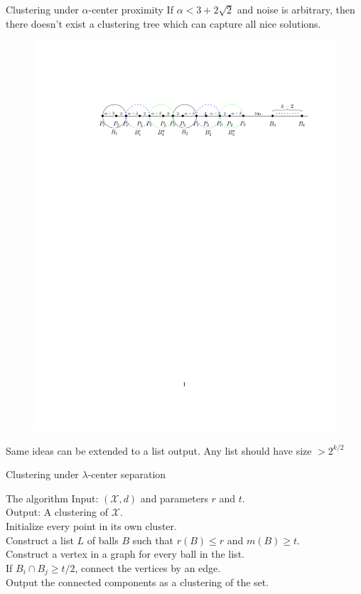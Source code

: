 \documentclass{beamer}
\newcommand{\mc}{\mathcal}
\begin{document}
\begin{frame}{Clustering under $\alpha$-center proximity}
	If $\alpha < 3 + 2\sqrt{2}$ and noise is arbitrary, then there doesn't exist a clustering tree which can capture all nice solutions.
	\begin{figure}[!t]
	  \begin{center}
	    \includegraphics[trim={47mm 205mm 12mm 44mm},clip,width=\textwidth]{lbdFig3.pdf}
	  \end{center}
	\end{figure}
	Same ideas can be extended to a list output. Any list should have size $> 2^{k/2}$
\end{frame}

\begin{frame}{Clustering under $\lambda$-center separation}
	\begin{block}{The algorithm}
	  Input: $(\mc X, d)$ and parameters $r$ and $t$.\\
	  Output: A clustering of $\mc X$.\\
	  \vspace{0.1in}Initialize every point in its own cluster.\\
	  Construct a list $L$ of balls $B$ such that $r(B) \le r$ and $m(B) \ge t$.\\
	  Construct a vertex in a graph for every ball in the list. \\
	  If $B_i \cap B_j \ge t/2$, connect the vertices by an edge.\\
	  Output the connected components as a clustering of the set.
    \end{block}
\end{frame}
\end{document}
